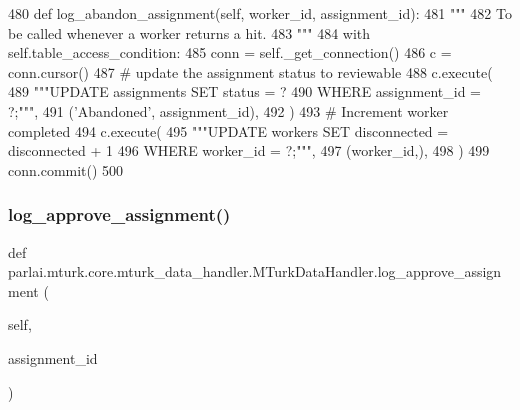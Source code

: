 \begin{DoxyCode}
480     \textcolor{keyword}{def }log\_abandon\_assignment(self, worker\_id, assignment\_id):
481         \textcolor{stringliteral}{"""}
482 \textcolor{stringliteral}{        To be called whenever a worker returns a hit.}
483 \textcolor{stringliteral}{        """}
484         with self.table\_access\_condition:
485             conn = self.\_get\_connection()
486             c = conn.cursor()
487             \textcolor{comment}{# update the assignment status to reviewable}
488             c.execute(
489                 \textcolor{stringliteral}{"""UPDATE assignments SET status = ?}
490 \textcolor{stringliteral}{                         WHERE assignment\_id = ?;"""},
491                 (\textcolor{stringliteral}{'Abandoned'}, assignment\_id),
492             )
493             \textcolor{comment}{# Increment worker completed}
494             c.execute(
495                 \textcolor{stringliteral}{"""UPDATE workers SET disconnected = disconnected + 1}
496 \textcolor{stringliteral}{                         WHERE worker\_id = ?;"""},
497                 (worker\_id,),
498             )
499             conn.commit()
500 
\end{DoxyCode}
\mbox{\label{classparlai_1_1mturk_1_1core_1_1mturk__data__handler_1_1MTurkDataHandler_adfbc9d075e9c0ffe22fc203676ad0a77}} 
\subsubsection{\texorpdfstring{log\+\_\+approve\+\_\+assignment()}{log\_approve\_assignment()}}
{\footnotesize\ttfamily def parlai.\+mturk.\+core.\+mturk\+\_\+data\+\_\+handler.\+M\+Turk\+Data\+Handler.\+log\+\_\+approve\+\_\+assignment (\begin{DoxyParamCaption}\item[{}]{self,  }\item[{}]{assignment\+\_\+id }\end{DoxyParamCaption})}

